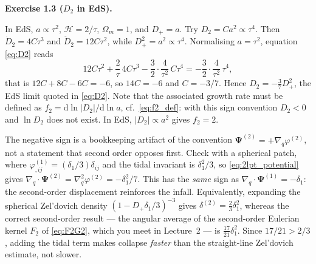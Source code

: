 \documentclass[a4paper,11pt]{article}
\newcommand{\vPsi}{\bm{\Psi}}
\def\cH{\mathcal{H}}
\newcommand{\dd}{\mathrm{d}}
\def\Om{\Omega_m}
\newenvironment{solution}[1]
  {\par\medskip\noindent\textbf{#1}\par\nobreak\smallskip}
  {\par\medskip}
\begin{document}
\begin{solution}{Exercise 1.3 ($D_2$ in EdS).}
In EdS, $a \propto \tau^2$, $\cH = 2/\tau$, $\Om = 1$, and $D_+ = a$. Try
$D_2 = C a^2 \propto \tau^4$. Then $\dot D_2 = 4C\tau^3$ and
$\ddot D_2 = 12C\tau^2$, while $D_+^2 = a^2 \propto \tau^4$. Normalising
$a = \tau^2$, equation \eqref{eq:D2} reads
\begin{equation*}
12C\tau^2 + \frac{2}{\tau}\,4C\tau^3 - \frac{3}{2}\cdot\frac{4}{\tau^2}\,C\tau^4
= -\frac{3}{2}\cdot\frac{4}{\tau^2}\,\tau^4 ,
\end{equation*}
that is $12C + 8C - 6C = -6$, so $14C = -6$ and $C = -3/7$. Hence
$D_2 = -\tfrac37 D_+^2$, the EdS limit quoted in \eqref{eq:D2}. Note that the
associated growth rate must be defined as $f_2 = \dd\ln|D_2|/\dd\ln a$, cf.\
\eqref{eq:f2_def}: with this sign convention $D_2<0$ and $\ln D_2$ does not
exist. In EdS, $|D_2| \propto a^2$ gives $f_2 = 2$.

The negative sign is a bookkeeping artifact of the convention
$\vPsi^{(2)} = +\nabla_q\varphi^{(2)}$, not a statement that second order opposes
first. Check with a spherical patch, where $\varphi^{(1)}_{,ij} = (\delta_1/3)\delta_{ij}$
and the tidal invariant is $\delta_1^2/3$, so \eqref{eq:2lpt_potential} gives
$\nabla_q\cdot\vPsi^{(2)} = \nabla^2_q\varphi^{(2)} = -\delta_1^2/7$. This has the
\emph{same} sign as $\nabla_q\cdot\vPsi^{(1)} = -\delta_1$: the second-order
displacement reinforces the infall. Equivalently, expanding the spherical
Zel'dovich density $(1-D_+\delta_1/3)^{-3}$ gives $\delta^{(2)} = \tfrac23\delta_1^2$,
whereas the correct second-order result --- the angular average of the
second-order Eulerian kernel $F_2$ of \eqref{eq:F2G2}, which you meet in
Lecture~2 --- is $\tfrac{17}{21}\delta_1^2$. Since $17/21 > 2/3$, adding the tidal term makes
collapse \emph{faster} than the straight-line Zel'dovich estimate, not slower.
\end{solution}
\end{document}
